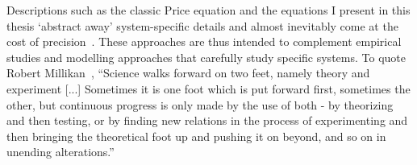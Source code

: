 Descriptions such as the classic Price equation and the equations I present in this thesis `abstract away' system-specific details and almost inevitably come at the cost of precision~\citep{levins_strategy_1966, potochnik_idealization_2018}. These approaches are thus intended to complement empirical studies and modelling approaches that carefully study specific systems. To quote Robert Millikan~\citep{millikan_electron_1924}, ``Science walks forward on two feet, namely theory and experiment [...] Sometimes it is one foot which is put forward first, sometimes the other, but continuous progress is only made by the use of both - by theorizing and then testing, or by finding new relations in the process of experimenting and then bringing the theoretical foot up and pushing it on beyond, and so on in unending alterations.''